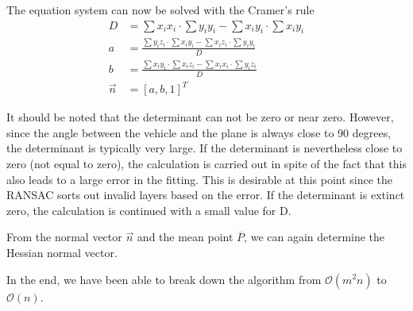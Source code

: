 \documentclass[11pt,oneside,openright]{mpreport}
\begin{document}
The equation system can now be solved with the Cramer's rule
\begin{align*}
D &= \sum x_i x_i \cdot \sum y_i y_i - \sum x_i y_i \cdot \sum x_i y_i \\
a &= \frac{\sum y_i z_i \cdot \sum x_i y_i - \sum x_i z_i \cdot \sum y_i y_i }{D}\\
b &= \frac{\sum x_i y_i \cdot \sum x_i z_i - \sum x_i x_i \cdot \sum y_i z_i }{D}\\
\vec{n} &= [a, b, 1]^T
\end{align*}

It should be noted that the determinant can not be zero or near zero. However, since the angle between the vehicle and the plane is always close to 90 degrees,
the determinant is typically very large. If the determinant is nevertheless close to zero (not equal to zero), the calculation is carried out in spite of the fact that
this also leads to a large error in the fitting. This is desirable at this point since the \ac{RANSAC} sorts out invalid layers based on the error.
If the determinant is extinct zero, the calculation is continued with a small value for D.

% 

From the normal vector $\vec{n}$ and the mean point $\overline{P}$, we can again determine the Hessian normal vector.

In the end, we have been able to break down the algorithm from $\mathcal{O}(m^2n)$ to $\mathcal{O}(n)$.
\end{document}
